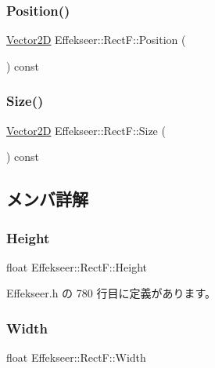 \subsubsection{\texorpdfstring{Position()}{Position()}}
{\footnotesize\ttfamily \mbox{\hyperlink{struct_effekseer_1_1_vector2_d}{Vector2D}} Effekseer\+::\+Rect\+F\+::\+Position (\begin{DoxyParamCaption}{ }\end{DoxyParamCaption}) const}

\mbox{\label{struct_effekseer_1_1_rect_f_a39dafae1e2537ce75d55473e8ea8aa13}} 
\subsubsection{\texorpdfstring{Size()}{Size()}}
{\footnotesize\ttfamily \mbox{\hyperlink{struct_effekseer_1_1_vector2_d}{Vector2D}} Effekseer\+::\+Rect\+F\+::\+Size (\begin{DoxyParamCaption}{ }\end{DoxyParamCaption}) const}



\subsection{メンバ詳解}
\mbox{\label{struct_effekseer_1_1_rect_f_a3ac44a8eb7b5ac78db5b5d98d5d1d745}} 
\subsubsection{\texorpdfstring{Height}{Height}}
{\footnotesize\ttfamily float Effekseer\+::\+Rect\+F\+::\+Height}



 Effekseer.\+h の 780 行目に定義があります。

\mbox{\label{struct_effekseer_1_1_rect_f_a52f9173e47c5677a549b69f1659476b1}} 
\subsubsection{\texorpdfstring{Width}{Width}}
{\footnotesize\ttfamily float Effekseer\+::\+Rect\+F\+::\+Width}



